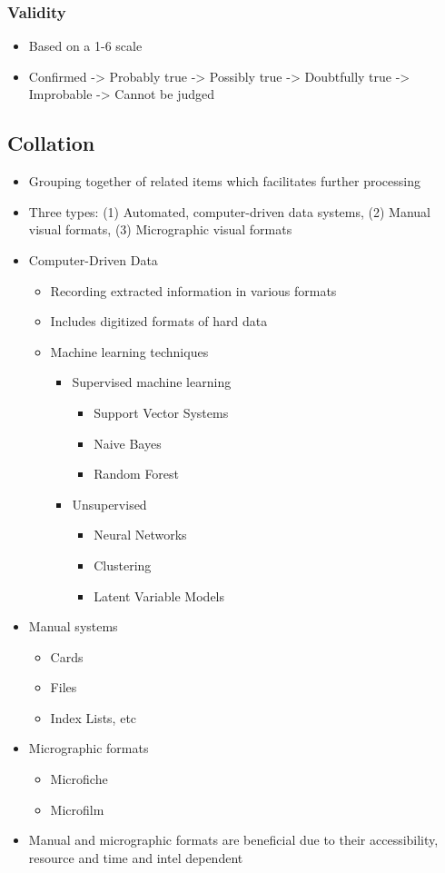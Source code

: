 \documentclass[11pt]{article}
\begin{document}
\subsubsection{Validity}
\label{sec:orgcfcd9e2}
\begin{itemize}
\item Based on a 1-6 scale
\item Confirmed -> Probably true -> Possibly true -> Doubtfully true -> Improbable -> Cannot be judged
\end{itemize}
\subsection{Collation}
\label{sec:orgc10198d}
\begin{itemize}
\item Grouping together of related items which facilitates further processing
\item Three types: (1) Automated, computer-driven data systems, (2) Manual visual formats, (3) Micrographic visual formats
\item Computer-Driven Data
\begin{itemize}
\item Recording extracted information in various formats
\item Includes digitized formats of hard data
\item Machine learning techniques
\begin{itemize}
\item Supervised machine learning
\begin{itemize}
\item Support Vector Systems
\item Naive Bayes
\item Random Forest
\end{itemize}
\item Unsupervised
\begin{itemize}
\item Neural Networks
\item Clustering
\item Latent Variable Models
\end{itemize}
\end{itemize}
\end{itemize}
\item Manual systems
\begin{itemize}
\item Cards
\item Files
\item Index Lists, etc
\end{itemize}
\item Micrographic formats
\begin{itemize}
\item Microfiche
\item Microfilm
\end{itemize}
\item Manual and micrographic formats are beneficial due to their accessibility, resource and time and intel dependent
\end{itemize}
\end{document}

